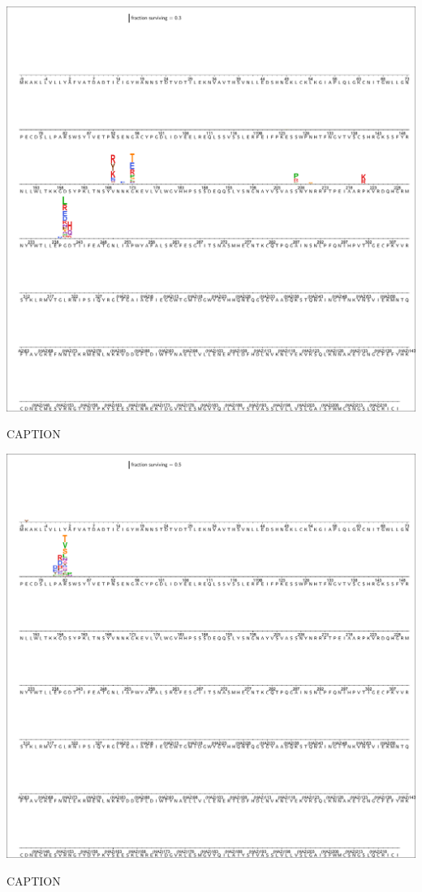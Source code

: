 \documentclass[11pt]{article}
\begin{document}
\begin{suppfigure}
\centerline{\includegraphics[trim=0.1cm 0.02cm 0.1cm 0.03cm,clip=true,width=\textwidth]{figs/logoplots/H17L10_fracsurvive.pdf}}
\caption{\label{suppfig:H17L10logo}
CAPTION}
\end{suppfigure}

\begin{suppfigure}
\centerline{\includegraphics[trim=0.1cm 0.02cm 0.1cm 0.03cm,clip=true,width=\textwidth]{figs/logoplots/H17L7_fracsurvive.pdf}}
\caption{\label{suppfig:H17L7logo}
CAPTION}
\end{suppfigure}
\end{document}
